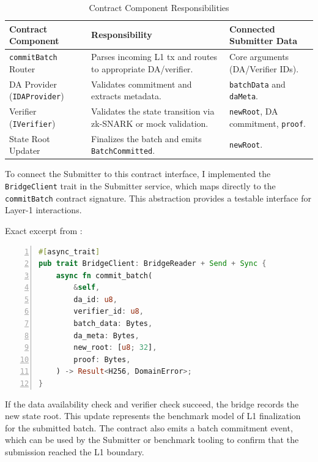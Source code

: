 \begin{table}[!htbp]
\centering
\caption{Contract Component Responsibilities}
\label{tab:contract_components}
\small
\setlength{\tabcolsep}{3pt}
\renewcommand{\arraystretch}{1.25}
\begin{tabularx}{\textwidth}{|
>{\raggedright\arraybackslash}p{}|
>{\raggedright\arraybackslash}X|
>{\raggedright\arraybackslash}X|}
\hline
\textbf{Contract Component} & \textbf{Responsibility} & \textbf{Connected Submitter Data} \\ \hline
\texttt{commitBatch} Router & Parses incoming L1 tx and routes to appropriate DA/verifier. & Core arguments (DA/Verifier IDs). \\ \hline
DA Provider (\texttt{IDAProvider}) & Validates commitment and extracts metadata. & \texttt{batchData} and \texttt{daMeta}. \\ \hline
Verifier (\texttt{IVerifier}) & Validates the state transition via zk-SNARK or mock validation. & \texttt{newRoot}, DA commitment, \texttt{proof}. \\ \hline
State Root Updater & Finalizes the batch and emits \texttt{BatchCommitted}. & \texttt{newRoot}. \\ \hline
\end{tabularx}
\end{table}

To connect the Submitter to this contract interface, I implemented the \texttt{BridgeClient} trait in the Submitter service, which maps directly to the \texttt{commitBatch} contract signature. This abstraction provides a testable interface for Layer-1 interactions.

\noindent
Exact excerpt from :

\begin{lstlisting}[language=Rust, numbers=left, breaklines=true, basicstyle=\ttfamily\small]
#[async_trait]
pub trait BridgeClient: BridgeReader + Send + Sync {
    async fn commit_batch(
        &self,
        da_id: u8,
        verifier_id: u8,
        batch_data: Bytes,
        da_meta: Bytes,
        new_root: [u8; 32],
        proof: Bytes,
    ) -> Result<H256, DomainError>;
}
\end{lstlisting}

If the data availability check and verifier check succeed, the bridge records the new state root. This update represents the benchmark model of L1 finalization for the submitted batch. The contract also emits a batch commitment event, which can be used by the Submitter or benchmark tooling to confirm that the submission reached the L1 boundary.

